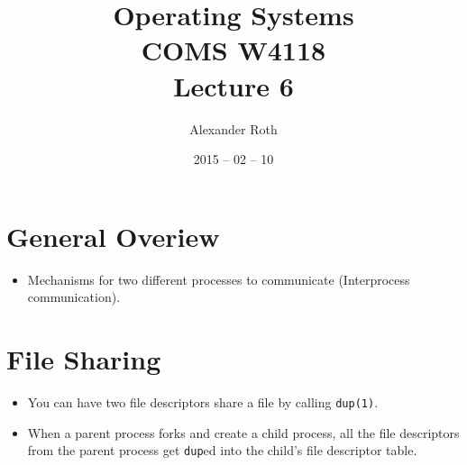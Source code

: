 \documentclass[]{article}
\begin{document}
\newcommand{\code}{\texttt}
\newtheorem{thm}{Theorem}
\title{Operating Systems \\ COMS W4118 \\ Lecture 6}
\author{Alexander Roth}
\date{2015 -- 02 -- 10}
\maketitle

\section{General Overiew}
\begin{itemize}
\item Mechanisms for two different processes to communicate (Interprocess
communication).
\end{itemize}

\section{File Sharing}
\begin{itemize}
\item You can have two file descriptors share a file by calling \code{dup(1)}.
\item When a parent process forks and create a child process, all the file
descriptors from the parent process get \code{dup}ed into the child's file
descriptor table.
\end{itemize}
\end{document}
